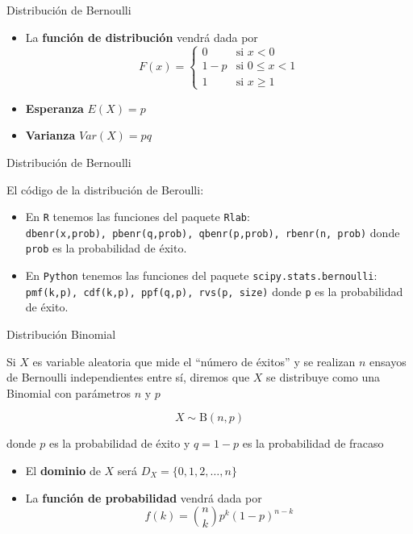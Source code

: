 \documentclass[
  ignorenonframetext,
]{beamer}
\providecommand{\tightlist}{%
  \setlength{\itemsep}{0pt}\setlength{\parskip}{0pt}}
\begin{document}
\begin{frame}{Distribución de Bernoulli}
\protect\hypertarget{distribuciuxf3n-de-bernoulli-1}{}

\begin{itemize}
\tightlist
\item
  La \textbf{función de distribución} vendrá dada por \[F(x) = \left\{
  \begin{array}{rl}
     0 & \text{si } x<0 
  \\ 1-p & \text{si } 0\le x<1
  \\ 1 & \text{si } x\ge 1
  \end{array}
  \right.\]
\item
  \textbf{Esperanza} \(E(X) = p\)
\item
  \textbf{Varianza} \(Var(X) = pq\)
\end{itemize}

\end{frame}

\begin{frame}[fragile]{Distribución de Bernoulli}
\protect\hypertarget{distribuciuxf3n-de-bernoulli-2}{}

El código de la distribución de Beroulli:

\begin{itemize}
\tightlist
\item
  En \texttt{R} tenemos las funciones del paquete \texttt{Rlab}:
  \texttt{dbenr(x,prob),\ pbenr(q,prob),\ qbenr(p,prob),\ rbenr(n,\ prob)}
  donde \texttt{prob} es la probabilidad de éxito.
\item
  En \texttt{Python} tenemos las funciones del paquete
  \texttt{scipy.stats.bernoulli}:
  \texttt{pmf(k,p),\ cdf(k,p),\ ppf(q,p),\ rvs(p,\ size)} donde
  \texttt{p} es la probabilidad de éxito.
\end{itemize}

\end{frame}

\begin{frame}{Distribución Binomial}
\protect\hypertarget{distribuciuxf3n-binomial}{}

Si \(X\) es variable aleatoria que mide el ``número de éxitos'' y se
realizan \(n\) ensayos de Bernoulli independientes entre sí, diremos que
\(X\) se distribuye como una Binomial con parámetros \(n\) y \(p\)

\[X\sim \text{B}(n,p)\]

donde \(p\) es la probabilidad de éxito y \(q = 1-p\) es la probabilidad
de fracaso

\begin{itemize}
\tightlist
\item
  El \textbf{dominio} de \(X\) será \(D_X = \{0,1,2,\dots,n\}\)
\item
  La \textbf{función de probabilidad} vendrá dada por
  \[f(k) = {n\choose k}p^k(1-p)^{n-k} \]
\end{itemize}

\end{frame}
\end{document}
